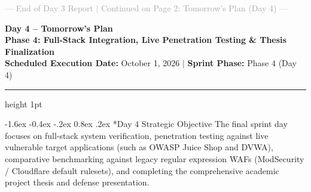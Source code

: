 \documentclass[11pt,a4paper]{article}
\makeatletter
\renewcommand{\section}{\@startsection{section}{1}{\z@}%
  {-1.6ex \@plus -0.4ex \@minus -.2ex}%
  {0.8ex \@plus .2ex}%
  {\normalfont\large\bfseries\color{primaryblue}}}
\makeatother
\begin{document}
\vfill
\begin{center}
\footnotesize \textcolor{darkgray}{--- End of Day 3 Report $\vert$ Continued on Page 2: Tomorrow's Plan (Day 4) ---}
\end{center}

\newpage

\begin{center}
    {\LARGE \textbf{\color{primaryblue} Day 4 -- Tomorrow's Plan}} \\[0.25em]
    {\large \textbf{Phase 4: Full-Stack Integration, Live Penetration Testing \& Thesis Finalization}} \\[0.2em]
    {\footnotesize \textbf{Scheduled Execution Date:} October 1, 2026 \quad $\vert$ \quad \textbf{Sprint Phase:} Phase 4 (Day 4)}
\end{center}

\vspace{0.3em}
\hrule height 1pt
\vspace{0.8em}

\section*{Day 4 Strategic Objective}
The final sprint day focuses on full-stack system verification, penetration testing against live vulnerable target applications (such as OWASP Juice Shop and DVWA), comparative benchmarking against legacy regular expression WAFs (ModSecurity / Cloudflare default rulesets), and completing the comprehensive academic project thesis and defense presentation.
\end{document}
